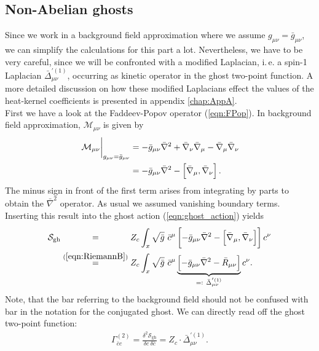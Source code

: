 \subsection{Non-Abelian ghosts}
Since we work in a background field approximation where we assume $g_{\mu\nu}=\bar{g}_{\mu\nu}$, we can simplify the calculations for this part a lot. Nevertheless, we have to be very careful, since we will be confronted with a modified Laplacian, i.\,e. a spin-1 Laplacian $\bar{\Delta}_{\mu\nu}^{'(1)}$, occurring as kinetic operator in the ghost two-point function. A more detailed discussion on how these modified Laplacians effect the values of the heat-kernel coefficients is presented in appendix \ref{chap:AppA}. \\
First we have a look at the Faddeev-Popov operator (\ref{eqn:FPop}). In background field approximation, $\mathcal{M}_{\mu\nu}$ is given by 
\begin{equation}
\begin{aligned}
	\eval{\mathcal{M}_{\mu\nu}}_{g_{\mu\nu}=\bar{g}_{\mu\nu}} &= -\bar{g}_{\mu\nu}\bar{\nabla}^2 + \bar{\nabla}_{\nu}\bar{\nabla}_{\mu} - \bar{\nabla}_{\mu}\bar{\nabla}_{\nu} \\
	&= -\bar{g}_{\mu\nu}\bar{\nabla}^2 - \left[\bar{\nabla}_{\mu}, \bar{\nabla}_{\nu}\right].
\end{aligned}
\end{equation} 
The minus sign in front of the first term arises from integrating by parts to obtain the $\bar{\nabla}^2$ operator. As usual we assumed vanishing boundary terms. Inserting this result into the ghost action (\ref{eqn:ghost_action}) yields
\begin{equation}
	\begin{aligned}
		\mathcal{S}_{\mathrm{gh}} &\overset{\phantom{(\mathrm{\ref{eqn:RiemannB}})}}{=} Z_c\int_x \sqrt{\bar{g}} \ \bar{c}^{\mu}\left[-\bar{g}_{\mu\nu}\bar{\nabla}^2 - \left[\bar{\nabla}_{\mu}, \bar{\nabla}_{\nu}\right]\right]  c^{\nu} \\
		&\overset{(\mathrm{\ref{eqn:RiemannB}})}{=}  Z_c\int_x \sqrt{\bar{g}} \ \bar{c}^{\mu}\underbrace{\left[-\bar{g}_{\mu\nu}\bar{\nabla}^2 - \bar{R}_{\mu\nu}\right]}_{=: \ \bar{\Delta}_{\mu\nu}^{'(1)}} c^{\nu}.
	\end{aligned}
\end{equation}
Note, that the bar referring to the background field should not be confused with bar in the notation for the conjugated ghost.
We can directly read off the ghost two-point function:
\begin{align}
	\Gamma^{(2)}_{\bar{c}c} = \frac{\delta^2 \mathcal{S}_{\mathrm{gh}}}{\delta c\ \delta\bar{c}} = Z_c \cdot\bar{\Delta}_{\mu\nu}^{'(1)}.
\end{align}
